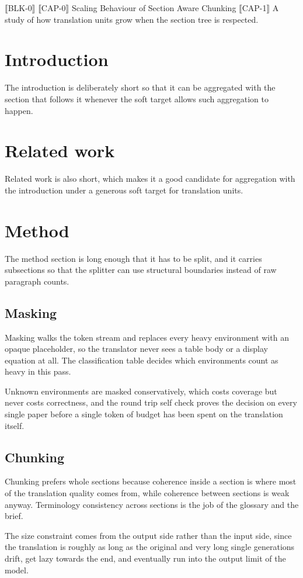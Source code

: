 ⟦BLK-0⟧
⟦CAP-0⟧ Scaling Behaviour of Section Aware Chunking
⟦CAP-1⟧ A study of how translation units grow when the section tree is respected.

\section{Introduction}
The introduction is deliberately short so that it can be aggregated with the section
that follows it whenever the soft target allows such aggregation to happen.

\section{Related work}
Related work is also short, which makes it a good candidate for aggregation with the
introduction under a generous soft target for translation units.

\section{Method}
The method section is long enough that it has to be split, and it carries subsections
so that the splitter can use structural boundaries instead of raw paragraph counts.

\subsection{Masking}
Masking walks the token stream and replaces every heavy environment with an opaque
placeholder, so the translator never sees a table body or a display equation at all.
The classification table decides which environments count as heavy in this pass.

Unknown environments are masked conservatively, which costs coverage but never costs
correctness, and the round trip self check proves the decision on every single paper
before a single token of budget has been spent on the translation itself.

\subsection{Chunking}
Chunking prefers whole sections because coherence inside a section is where most of
the translation quality comes from, while coherence between sections is weak anyway.
Terminology consistency across sections is the job of the glossary and the brief.

The size constraint comes from the output side rather than the input side, since the
translation is roughly as long as the original and very long single generations drift,
get lazy towards the end, and eventually run into the output limit of the model.

